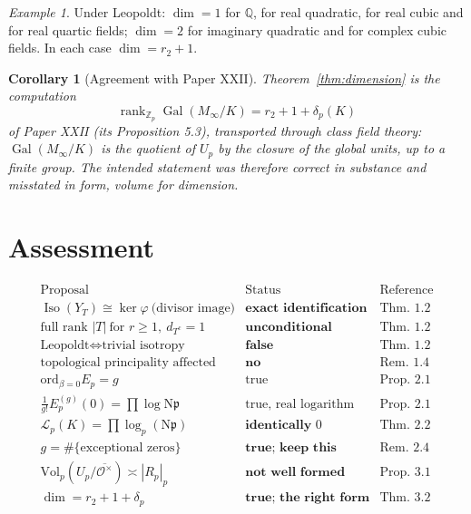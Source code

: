 \documentclass[11pt]{amsart}
\numberwithin{equation}{section}
\newtheorem{corollary}[theorem]{Corollary}
\theoremstyle{definition}
\theoremstyle{remark}
\newtheorem{example}[theorem]{Example}
\newcommand{\Z}{\mathbb{Z}}
\newcommand{\Q}{\mathbb{Q}}
\newcommand{\cO}{\mathcal{O}}
\newcommand{\cL}{\mathcal{L}}
\newcommand{\pp}{\mathfrak{p}}
\newcommand{\Ns}{\mathrm{N}}
\newcommand{\Gal}{\operatorname{Gal}}
\newcommand{\Iso}{\operatorname{Iso}}
\newcommand{\rank}{\operatorname{rank}}
\begin{document}
\begin{example}\label{ex:dim}
Under Leopoldt: $\dim=1$ for $\Q$, for real quadratic, for real cubic and for real quartic
fields; $\dim=2$ for imaginary quadratic and for complex cubic fields. In each case
$\dim=r_2+1$.
\end{example}

\begin{corollary}[Agreement with Paper XXII]\label{cor:agree}
Theorem~\ref{thm:dimension} is the computation
\[
\rank_{\Z_p}\Gal(M_\infty/K)=r_2+1+\delta_p(K)
\]
of Paper XXII (its Proposition 5.3), transported through class field theory:
$\Gal(M_\infty/K)$ is the quotient of $U_p$ by the
closure of the global units, up to a finite group. The intended statement was therefore
correct in substance and misstated in form, volume for dimension.
\end{corollary}

\section{Assessment}

\[
\begin{array}{lll}
\text{Proposal} & \text{Status} & \text{Reference}\\\hline
\Iso(Y_T)\cong\ker\varphi\ \text{(divisor image)} & \textbf{exact identification} & \text{Thm.~1.2}\\
\text{full rank }|T|\ \text{for }r\ge1,\ d_{T^c}=1 & \textbf{unconditional} & \text{Thm.~1.2}\\
\text{Leopoldt}\iff\text{trivial isotropy} & \textbf{false} & \text{Thm.~1.2}\\
\text{topological principality affected} & \textbf{no} & \text{Rem.~1.4}\\
\mathrm{ord}_{\beta=0}E_p=g & \text{true} & \text{Prop.~2.1}\\
\tfrac{1}{g!}E_p^{(g)}(0)=\prod\log\Ns\pp & \text{true, real logarithm} & \text{Prop.~2.1}\\
\cL_p(K)=\prod\log_p(\Ns\pp) & \textbf{identically }0 & \text{Thm.~2.2}\\
g=\#\{\text{exceptional zeros}\} & \textbf{true; keep this} & \text{Rem.~2.4}\\
\mathrm{Vol}_p(U_p/\overline{\cO^\times})\asymp|R_p|_p & \textbf{not well formed} & \text{Prop.~3.1}\\
\dim=r_2+1+\delta_p & \textbf{true; the right form} & \text{Thm.~3.2}
\end{array}
\]
\end{document}
